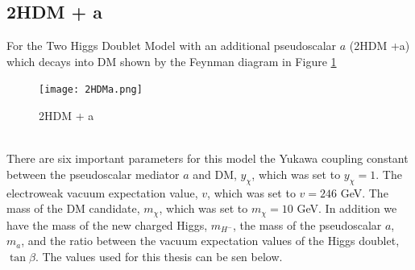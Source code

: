 \documentclass[12pt, a4paper]{book}
\begin{document}
\subsection{2HDM + a}
For the Two Higgs Doublet Model with an additional pseudoscalar $a$ (2HDM +a) which decays into DM shown by the Feynman diagram in Figure \ref{fig:2HDM}
\begin{figure}[!ht]
    \centering
    \texttt{[image: 2HDMa.png]}
    \caption{2HDM + a}\label{fig:2HDM}
\end{figure}
\\ There are six important parameters for this model the Yukawa coupling constant between the pseudoscalar mediator $a$ and DM, $y_\chi$, which was set to $y_\chi=1$. The electroweak vacuum expectation value, $v$, which was set to $v=246$ GeV. 
The mass of the DM candidate, $m_\chi$, which was set to $m_\chi=10$ GeV. In addition we have the mass of the new charged Higgs, $m_{H^-}$, the mass of the pseudoscalar $a$, $m_a$, and the ratio between the vacuum expectation values of the Higgs doublet, $\tan\beta$. The values used for this thesis can be sen below.
\graphicspath{{../../../Plots/2d_masses/}}
\end{document}
